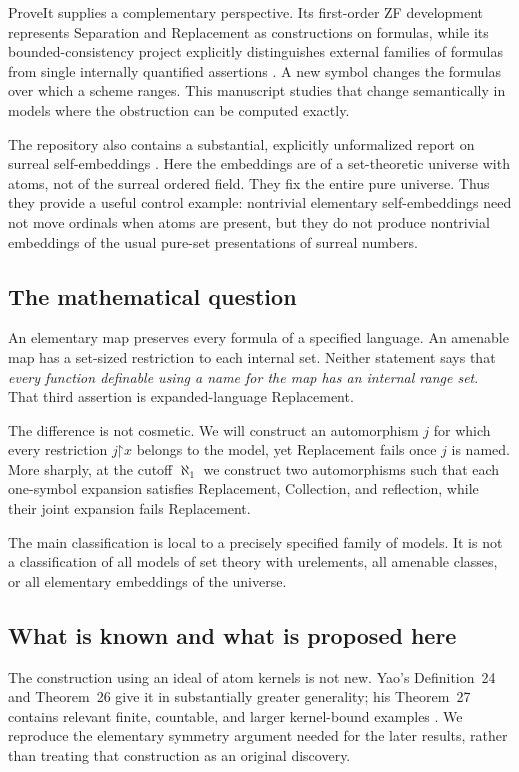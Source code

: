 \documentclass[11pt,letterpaper]{article}
\numberwithin{equation}{section}
\theoremstyle{plain}
\theoremstyle{definition}
\theoremstyle{remark}
\begin{document}
ProveIt supplies a complementary perspective. Its first-order ZF development represents Separation and Replacement as constructions on formulas, while its bounded-consistency project explicitly distinguishes external families of formulas from single internally quantified assertions \cite{RepoZF,RepoBC}. A new symbol changes the formulas over which a scheme ranges. This manuscript studies that change semantically in models where the obstruction can be computed exactly.

The repository also contains a substantial, explicitly unformalized report on surreal self-embeddings \cite{RepoSSE}. Here the embeddings are of a set-theoretic universe with atoms, not of the surreal ordered field. They fix the entire pure universe. Thus they provide a useful control example: nontrivial elementary self-embeddings need not move ordinals when atoms are present, but they do not produce nontrivial embeddings of the usual pure-set presentations of surreal numbers.

\subsection{The mathematical question}
An elementary map preserves every formula of a specified language. An amenable map has a set-sized restriction to each internal set. Neither statement says that \emph{every function definable using a name for the map has an internal range set}. That third assertion is expanded-language Replacement.

The difference is not cosmetic. We will construct an automorphism $j$ for which every restriction $j\mathord{\upharpoonright}x$ belongs to the model, yet Replacement fails once $j$ is named. More sharply, at the cutoff $\aleph_1$ we construct two automorphisms such that each one-symbol expansion satisfies Replacement, Collection, and reflection, while their joint expansion fails Replacement.

The main classification is local to a precisely specified family of models. It is not a classification of all models of set theory with urelements, all amenable classes, or all elementary embeddings of the universe.

\subsection{What is known and what is proposed here}
The construction using an ideal of atom kernels is not new. Yao's Definition~24 and Theorem~26 give it in substantially greater generality; his Theorem~27 contains relevant finite, countable, and larger kernel-bound examples \cite{Yao2023}. We reproduce the elementary symmetry argument needed for the later results, rather than treating that construction as an original discovery.
\end{document}
